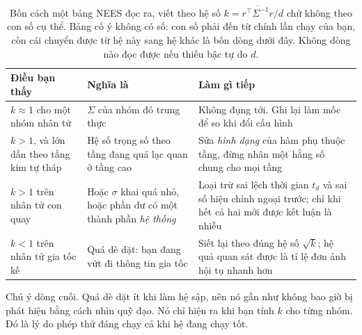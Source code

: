 \documentclass[../../deep_learning.tex]{subfiles}
\begin{document}
\begin{table}[H]\centering\footnotesize
\caption{Bốn cách một bảng NEES đọc ra, viết theo hệ số \(k = \overline{r^{\top}\Sigma^{-1}r}/d\) chứ không theo con số cụ thể. Bảng cố ý không có số: con số phải đến từ chính lần chạy của bạn, còn cái chuyển được từ hệ này sang hệ khác là bốn dòng dưới đây. Không dòng nào đọc được nếu thiếu bậc tự do \(d\).}
\label{tab:f34-nees-mau}
\begin{tabularx}{\linewidth}{@{}L{3.6cm}L{3.0cm}Y@{}}
\toprule
\textbf{Điều bạn thấy} & \textbf{Nghĩa là} & \textbf{Làm gì tiếp}\\
\midrule
\(k \approx 1\) cho một nhóm nhân tử & \(\Sigma\) của nhóm đó trung thực & Không đụng tới. Ghi lại làm mốc để so khi đổi cấu hình\\
\(k > 1\), và lớn dần theo tầng kim tự tháp & Hệ số trọng số theo tầng đang quá lạc quan ở tầng cao & Sửa \emph{hình dạng} của hàm phụ thuộc tầng, đừng nhân một hằng số chung cho mọi tầng\\
\(k > 1\) trên nhân tử con quay & Hoặc \(\sigma\) khai quá nhỏ, hoặc phần dư có một thành phần \emph{hệ thống} & Loại trừ sai lệch thời gian \(t_d\) và sai số hiệu chỉnh ngoại trước; chỉ khi hết cả hai mới được kết luận là nhiễu\\
\(k < 1\) trên nhân tử gia tốc kế & Quá dè dặt: bạn đang vứt đi thông tin gia tốc & Siết lại theo đúng hệ số \(\sqrt{k}\); hệ quả quan sát được là tỉ lệ đơn ảnh hội tụ nhanh hơn\\
\bottomrule
\end{tabularx}
\end{table}

Chú ý dòng cuối. Quá dè dặt ít khi làm hệ sập, nên nó gần như không bao giờ bị phát hiện bằng cách nhìn quỹ đạo. Nó chỉ hiện ra khi bạn tính \(k\) cho từng nhóm. Đó là lý do phép thử đáng chạy cả khi hệ đang chạy tốt.
\end{document}
